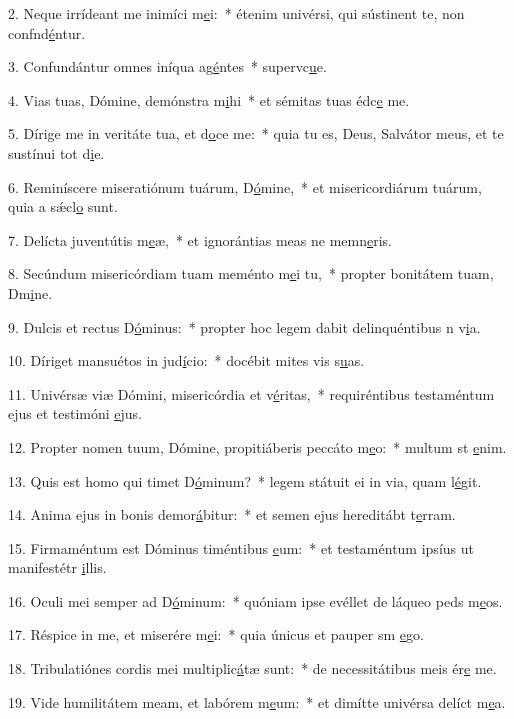 2. Neque irrídeant me inimíci m\uline{e}i:~* étenim univérsi, qui sústinent te, non confnd\uline{é}ntur.\par 
3. Confundántur omnes iníqua ag\uline{é}ntes~* supervc\uline{u}e.\par 
4. Vias tuas, Dómine, demónstra m\uline{i}hi~* et sémitas tuas édc\uline{e} me.\par 
5. Dírige me in veritáte tua, et d\uline{o}ce me:~* quia tu es, Deus, Salvátor meus, et te sustínui tot d\uline{i}e.\par 
6. Reminíscere miseratiónum tuárum, D\uline{ó}mine,~* et misericordiárum tuárum, quia a sǽcl\uline{o} sunt.\par 
7. Delícta juventútis m\uline{e}æ,~* et ignorántias meas ne memn\uline{e}ris.\par 
8. Secúndum misericórdiam tuam meménto m\uline{e}i tu,~* propter bonitátem tuam, Dm\uline{i}ne.\par 
9. Dulcis et rectus D\uline{ó}minus:~* propter hoc legem dabit delinquéntibus n v\uline{i}a.\par 
10. Díriget mansuétos in jud\uline{í}cio:~* docébit mites vis s\uline{u}as.\par 
11. Univérsæ viæ Dómini, misericórdia et v\uline{é}ritas,~* requiréntibus testaméntum ejus et testimóni \uline{e}jus.\par 
12. Propter nomen tuum, Dómine, propitiáberis peccáto m\uline{e}o:~* multum st \uline{e}nim.\par 
13. Quis est homo qui timet D\uline{ó}minum?~* legem státuit ei in via, quam l\uline{é}git.\par 
14. Anima ejus in bonis demor\uline{á}bitur:~* et semen ejus hereditábt t\uline{e}rram.\par 
15. Firmaméntum est Dóminus timéntibus \uline{e}um:~* et testaméntum ipsíus ut manifestétr \uline{i}llis.\par 
16. Oculi mei semper ad D\uline{ó}minum:~* quóniam ipse evéllet de láqueo peds m\uline{e}os.\par 
17. Réspice in me, et miserére m\uline{e}i:~* quia únicus et pauper sm \uline{e}go.\par 
18. Tribulatiónes cordis mei multiplic\uline{á}tæ sunt:~* de necessitátibus meis ér\uline{e} me.\par 
19. Vide humilitátem meam, et labórem m\uline{e}um:~* et dimítte univérsa delíct m\uline{e}a.\par 
